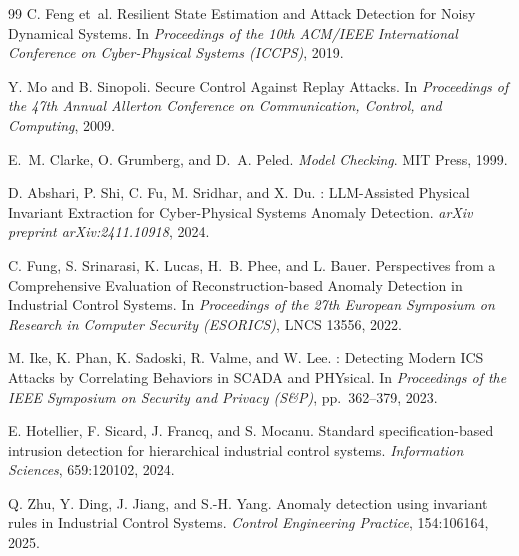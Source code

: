 \documentclass[sigconf,anonymous,review]{acmart}
\begin{document}
\begin{thebibliography}{99}
C. Feng et~al.
\newblock Resilient State Estimation and Attack Detection for Noisy Dynamical
  Systems.
\newblock In \emph{Proceedings of the 10th ACM/IEEE International Conference
  on Cyber-Physical Systems (ICCPS)}, 2019.

Y. Mo and B. Sinopoli.
\newblock Secure Control Against Replay Attacks.
\newblock In \emph{Proceedings of the 47th Annual Allerton Conference on
  Communication, Control, and Computing}, 2009.

E.~M. Clarke, O. Grumberg, and D.~A. Peled.
\newblock \emph{Model Checking}.
\newblock MIT Press, 1999.

D. Abshari, P. Shi, C. Fu, M. Sridhar, and X. Du.
: {LLM}-Assisted Physical Invariant Extraction for
  Cyber-Physical Systems Anomaly Detection.
\newblock \emph{arXiv preprint arXiv:2411.10918}, 2024.

C. Fung, S. Srinarasi, K. Lucas, H.~B. Phee, and L. Bauer.
\newblock Perspectives from a Comprehensive Evaluation of Reconstruction-based
  Anomaly Detection in Industrial Control Systems.
\newblock In \emph{Proceedings of the 27th European Symposium on Research in
  Computer Security (ESORICS)}, LNCS 13556, 2022.

M. Ike, K. Phan, K. Sadoski, R. Valme, and W. Lee.
: Detecting Modern {ICS} Attacks by Correlating Behaviors in
  {SCADA} and {PHY}sical.
\newblock In \emph{Proceedings of the IEEE Symposium on Security and Privacy
  (S\&P)}, pp.~362--379, 2023.

E. Hotellier, F. Sicard, J. Francq, and S. Mocanu.
\newblock Standard specification-based intrusion detection for hierarchical
  industrial control systems.
\newblock \emph{Information Sciences}, 659:120102, 2024.
\newblock {}

Q. Zhu, Y. Ding, J. Jiang, and S.-H. Yang.
\newblock Anomaly detection using invariant rules in Industrial Control Systems.
\newblock \emph{Control Engineering Practice}, 154:106164, 2025.

\end{thebibliography}
\end{document}
